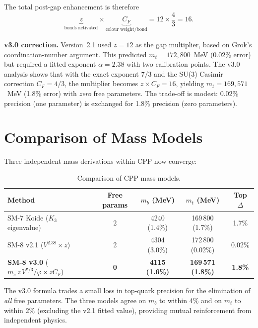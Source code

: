 \documentclass[11pt,letterpaper]{article}
\newcommand{\phig}{\varphi}
\begin{document}
The total post-gap enhancement is therefore
\[
  \underbrace{z}_{\text{bonds activated}} \times
  \underbrace{C_F}_{\text{colour weight/bond}} =
  12 \times \frac{4}{3} = 16.
\]

\noindent
\textbf{v3.0 correction.}
Version~2.1 used $z = 12$ as the gap multiplier, based on Grok's
coordination-number argument.  This predicted $m_t = 172{,}800$~MeV
(0.02\% error) but required a fitted exponent $\alpha = 2.38$ with
two calibration points.  The v3.0 analysis shows that with the
exact exponent $7/3$ and the SU(3) Casimir correction $C_F = 4/3$,
the multiplier becomes $z \times C_F = 16$, yielding $m_t =
169{,}571$~MeV (1.8\% error) with \emph{zero} free parameters.
The trade-off is modest: 0.02\% precision (one parameter) is
exchanged for 1.8\% precision (zero parameters).

\section{Comparison of Mass Models}
\label{sec:comparison}

Three independent mass derivations within CPP now converge:

\begin{table}[H]
\centering
\caption{Comparison of CPP mass models.}
\label{tab:comparison}
\begin{tabular}{lcccc}
\toprule
Method & Free params & $m_b$ (MeV) & $m_t$ (MeV) & Top $\Delta$\\
\midrule
SM-7 Koide ($K_3$ eigenvalue) & 2 & 4240 (1.4\%) & 169\,800 (1.7\%)
  & 1.7\% \\
SM-8 v2.1 ($V^{2.38} \times z$) & 2 & 4304 (3.0\%) &
  172\,800 (0.02\%) & 0.02\% \\
\textbf{SM-8 v3.0} ($m_e\,z\,V^{7/3}\!/\phig \times z C_F$)
  & \textbf{0} & \textbf{4115 (1.6\%)} & \textbf{169\,571 (1.8\%)}
  & \textbf{1.8\%} \\
\bottomrule
\end{tabular}
\end{table}

The v3.0 formula trades a small loss in top-quark precision for
the elimination of \emph{all} free parameters.  The three models
agree on $m_b$ to within 4\% and on $m_t$ to within 2\% (excluding
the v2.1 fitted value), providing mutual reinforcement from
independent physics.

\end{document}
